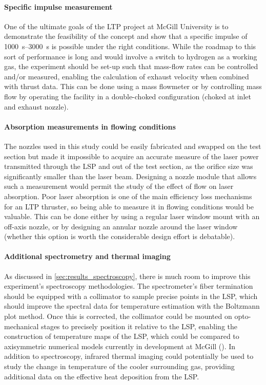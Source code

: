         \paragraph{Specific impulse measurement} One of the ultimate goals of the LTP project at McGill University is to demonstrate the feasibility of the concept and show that a specific impulse of \qtyrange{1000}{3000}{s} is possible under the right conditions. While the roadmap to this sort of performance is long and would involve a switch to hydrogen as a working gas, the experiment should be set-up such that mass-flow rates can be controlled and/or measured, enabling the calculation of exhaust velocity when combined with thrust data. This can be done using a mass flowmeter or by controlling mass flow by operating the facility in a double-choked configuration (choked at inlet and exhaust nozzle).

        \paragraph{Absorption measurements in flowing conditions} The nozzles used in this study could be easily fabricated and swapped on the test section but made it impossible to acquire an accurate measure of the laser power transmitted through the LSP and out of the test section, as the orifice size was significantly smaller than the laser beam. Designing a nozzle module that allows such a measurement would permit the study of the effect of flow on laser absorption. Poor laser absorption is one of the main efficiency loss mechanisms for an LTP thruster, so being able to measure it in flowing conditions would be valuable. This can be done either by using a regular laser window mount with an off-axis nozzle, or by designing an annular nozzle around the laser window (whether this option is worth the considerable design effort is debatable).

        \paragraph{Additional spectrometry and thermal imaging} As discussed in \autoref{sec:results_spectroscopy}, there is much room to improve this experiment's spectroscopy methodologies. The spectrometer's fiber termination should be equipped with a collimator to sample precise points in the LSP, which should improve the spectral data for temperature estimation with the Boltzmann plot method. Once this is corrected, the collimator could be mounted on opto-mechanical stages to precisely position it relative to the LSP, enabling the construction of temperature maps of the LSP, which could be compared to axisymmetric numerical models currently in development at McGill (\textcite{baoTwoDimensionalSimulationLasera}). In addition to spectroscopy, infrared thermal imaging could potentially be used to study the change in temperature of the cooler surrounding gas, providing additional data on the effective heat deposition from the LSP.